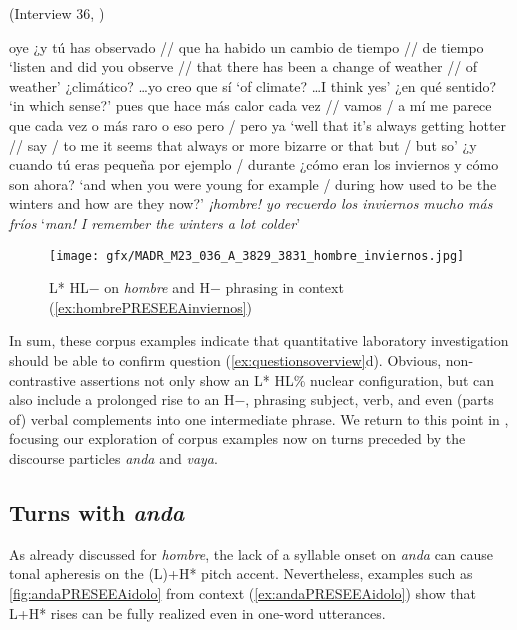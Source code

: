 \begin{exe}
	\ex (Interview 36, \cite{PRESEEA.20142020})\label{ex:hombrePRESEEAinviernos}
	\begin{xlist}[A:]
	  oye ¿y tú has observado // que ha habido un cambio de tiempo // de tiempo 
	\glt `listen and did you observe // that there has been a change of weather // of weather'
	  ¿climático? \ldots yo creo que sí 
	\glt `of climate? \ldots I think yes' 
	  ¿en qué sentido? 
	\glt `in which sense?'
	  pues que hace más calor cada vez // vamos / a mí me parece que cada vez o más raro o eso pero / pero ya 
	\glt `well that it's always getting hotter // say / to me it seems that always or more bizarre or that but / but so'
	  ¿y cuando tú eras pequeña por ejemplo / durante ¿cómo eran los inviernos y cómo son ahora? 
	\glt `and when you were young for example / during how used to be the winters and how are they now?'
	  \textit{¡hombre! yo recuerdo los inviernos mucho más fríos}
	\glt `\textit{man! I remember the winters a lot colder}' 
	\end{xlist}
\end{exe}

\begin{figure}
	\texttt{[image: gfx/MADR\_M23\_036\_A\_3829\_3831\_hombre\_inviernos.jpg]}
	\caption{L* HL$-$ on \textit{hombre} and H$-$ phrasing in context (\ref{ex:hombrePRESEEAinviernos}) \href{https://osf.io/jwtbf/}{\faVolumeUp} \label{fig:hombrePRESEEAinviernos}}
\end{figure}

In sum, these corpus examples indicate that quantitative laboratory investigation should be able to confirm question (\ref{ex:questionsoverview}d). Obvious, non-contrastive assertions not only show an L* HL\% nuclear configuration, but can also include a prolonged rise to an H$-$, phrasing subject, verb, and even (parts of) verbal complements into one intermediate phrase. We return to this point in , focusing our exploration of corpus examples now on turns preceded by the discourse particles \textit{anda} and \textit{vaya}.

\subsection{Turns with \textit{anda}}
\label{ch:5.2.3}

As already discussed for \textit{hombre}, the lack of a syllable onset on \textit{anda} can cause tonal apheresis on the (L)+H* pitch accent. Nevertheless, examples such as \autoref{fig:andaPRESEEAidolo} from context (\ref{ex:andaPRESEEAidolo}) show that L+H* rises can be fully realized even in one-word utterances.

